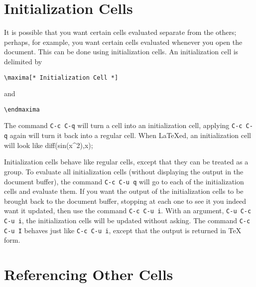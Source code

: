 \documentclass{article}
\begin{document}
\section{Initialization Cells}

\noindent
It is possible that you want certain cells evaluated separate from the
others; perhaps, for example, you want certain cells evaluated whenever
you open the document.  This can be done using initialization cells.
An initialization cell is delimited by
\begin{verbatim}
\maxima[* Initialization Cell *]
\end{verbatim}
\noindent
and
\begin{verbatim}
\endmaxima
\end{verbatim}
\noindent
The command \texttt{C-c C-q} will turn a cell into
an initialization cell, applying \texttt{C-c C-q} again will turn it
back into a regular cell.  
When \LaTeX{}ed, an initialization cell will look like
diff(sin(x^2),x);
\endmaxima

Initialization cells behave like regular
cells, except that they can be treated as a group.
To evaluate all initialization cells (without displaying the output in
the document buffer), the
command \texttt{C-c C-u q} will go to each of the
initialization cells and evaluate them.
If you want the output of the initialization cells to be brought back 
to the document buffer,  stopping at each one to see it
you indeed want it updated, then use the command \texttt{C-c C-u i}.
With an argument, \texttt{C-u C-c C-u i}, the
initialization cells will be updated without asking.   The command 
\texttt{C-c C-u I} behaves just like \texttt{C-c C-u i},
except that the output is returned in \TeX{} form.

\section{Referencing Other Cells}
\end{document}
